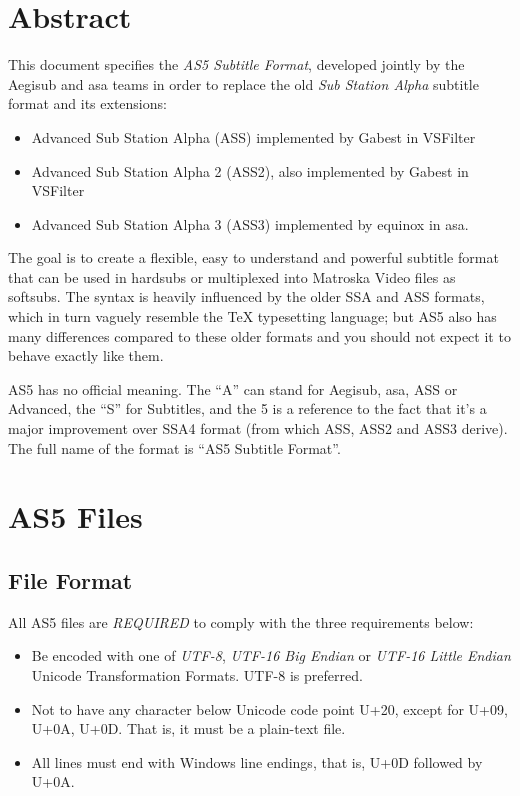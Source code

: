 \documentclass{spec}
\begin{document}
\setlength{\parskip}{0pt}
\tableofcontents
\newpage
\setlength{\parskip}{8pt}


\section{Abstract}
This document specifies the \emph{AS5 Subtitle Format}, developed jointly by the
Aegisub\cite{Aegisub} and asa\cite{asa} teams in order to replace the old
\emph{Sub Station Alpha}\cite{SSA} subtitle format and its extensions:

\begin{itemize}
\item Advanced Sub Station Alpha (ASS) implemented by Gabest in VSFilter\cite{VSFilter}
\item Advanced Sub Station Alpha 2 (ASS2), also implemented by Gabest in VSFilter
\item Advanced Sub Station Alpha 3 (ASS3) implemented by equinox in asa.
\end{itemize}

The goal is to create a flexible, easy to understand and powerful subtitle format
that can be used in hardsubs or multiplexed into Matroska Video\cite{mkv} files as
softsubs. The syntax is heavily influenced by the older SSA and ASS formats, which in
turn vaguely resemble the TeX typesetting language; but AS5 also has many differences
compared to these older formats and you should not expect it to behave exactly like them.

AS5 has no official meaning. The ``A'' can stand for Aegisub, asa, ASS or Advanced,
the ``S'' for Subtitles, and the 5 is a reference to the fact that it's a major
improvement over SSA4 format (from which ASS, ASS2 and ASS3 derive). The full
name of the format is ``AS5 Subtitle Format''.


\newpage
\section{AS5 Files}
\subsection{File Format}
All AS5 files are \emph{REQUIRED} to comply with the three requirements below:

\begin{itemize}
\item Be encoded with one of \emph{UTF-8}\cite{UTF-8}, \emph{UTF-16 Big Endian}
\cite{UTF-16} or \emph{UTF-16 Little Endian} Unicode Transformation Formats. UTF-8 is
preferred.
\item Not to have any character below Unicode code point U+20, except for U+09, U+0A, U+0D.
That is, it must be a plain-text file.
\item All lines must end with Windows line endings, that is, U+0D followed by U+0A.
\end{itemize}
\end{document}
